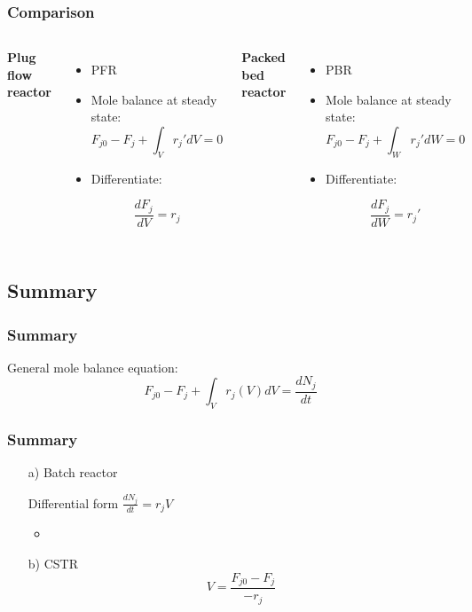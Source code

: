 \begin{frame}\frametitle{Comparison}
	\begin{columns}[t]
			\textbf{Plug flow reactor}
			\begin{itemize}
				\item	PFR
				\item	Mole balance at steady state: $$F_{j0} - F_j + \int_Vr_j'dV = 0$$ 
				\item	Differentiate:

				$$\boxed{\frac{dF_j}{dV} = r_j}$$
			\end{itemize}
			\textbf{Packed bed reactor}
			\begin{itemize}
				\item	PBR
				\item	Mole balance at steady state: $$F_{j0} - F_j + \int_Wr_j'dW = 0$$
				\item	Differentiate:

				$$\boxed{\frac{dF_j}{dW} = r_j'}$$
			\end{itemize}
	\end{columns}
	
	
\end{frame}

\subsection{Summary}
\begin{frame}\frametitle{Summary}
	General mole balance equation: $$ F_{j0} - F_j + \int_Vr_j(V)dV = \frac{dN_j}{dt} $$
\end{frame}

\begin{frame}\frametitle{Summary}
	\begin{itemize}
		\item[a)]{Batch reactor}

		Differential form $\displaystyle\frac{dN_j}{dt} = r_jV$
		\vspace{6pt}
		\begin{itemize}
			\item	{\color{myOrange}{Can we ever make a steady-state assumption for batch?}}
		\end{itemize}
		\vspace{24pt}
		\item[b)]{CSTR} $$V = \frac{F_{j0} - F_j}{-r_j}$$
	\end{itemize}
\end{frame}

